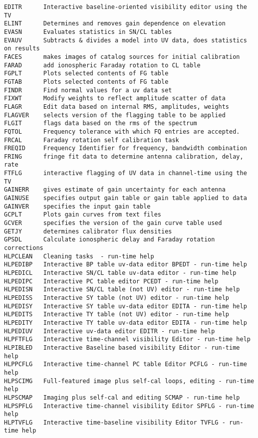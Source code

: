\begin{verbatim}
EDITR      Interactive baseline-oriented visibility editor using the TV
ELINT      Determines and removes gain dependence on elevation
EVASN      Evaluates statistics in SN/CL tables
EVAUV      Subtracts & divides a model into UV data, does statistics on results
FACES      makes images of catalog sources for initial calibration
FARAD      add ionospheric Faraday rotation to CL table
FGPLT      Plots selected contents of FG table
FGTAB      Plots selected contents of FG table
FINDR      Find normal values for a uv data set
FIXWT      Modify weights to reflect amplitude scatter of data
FLAGR      Edit data based on internal RMS, amplitudes, weights
FLAGVER    selects version of the flagging table to be applied
FLGIT      flags data based on the rms of the spectrum
FQTOL      Frequency tolerance with which FQ entries are accepted.
FRCAL      Faraday rotation self calibration task
FREQID     Frequency Identifier for frequency, bandwidth combination
FRING      fringe fit data to determine antenna calibration, delay, rate
FTFLG      interactive flagging of UV data in channel-time using the TV
GAINERR    gives estimate of gain uncertainty for each antenna
GAINUSE    specifies output gain table or gain table applied to data
GAINVER    specifies the input gain table
GCPLT      Plots gain curves from text files
GCVER      specifies the version of the gain curve table used
GETJY      determines calibrator flux densities
GPSDL      Calculate ionospheric delay and Faraday rotation corrections
HLPCLEAN   Cleaning tasks  - run-time help
HLPEDIBP   Interactive BP table uv-data editor BPEDT - run-time help
HLPEDICL   Interactive SN/CL table uv-data editor - run-time help
HLPEDIPC   Interactive PC table editor PCEDT - run-time help
HLPEDISN   Interactive SN/CL table (not UV) editor - run-time help
HLPEDISS   Interactive SY table (not UV) editor - run-time help
HLPEDISY   Interactive SY table uv-data editor EDITA - run-time help
HLPEDITS   Interactive TY table (not UV) editor - run-time help
HLPEDITY   Interactive TY table uv-data editor EDITA - run-time help
HLPEDIUV   Interactive uv-data editor EDITR - run-time help
HLPFTFLG   Interactive time-channel visibility Editor - run-time help
HLPIBLED   Interactive Baseline based visibility Editor - run-time help
HLPPCFLG   Interactive time-channel PC table Editor PCFLG - run-time help
HLPSCIMG   Full-featured image plus self-cal loops, editing - run-time help
HLPSCMAP   Imaging plus self-cal and editing SCMAP - run-time help
HLPSPFLG   Interactive time-channel visibility Editor SPFLG - run-time help
HLPTVFLG   Interactive time-baseline visibility Editor TVFLG - run-time help

\end{verbatim}
